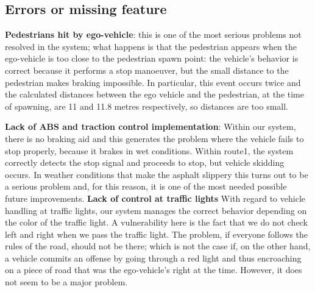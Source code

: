 \documentclass{article}
\begin{document}
\subsection{Errors or missing feature}
\textbf{Pedestrians hit by ego-vehicle}: this is one of the most serious problems not resolved in the system; what 
    happens is that the pedestrian appears when the ego-vehicle is too close to the pedestrian spawn point: the vehicle's behavior 
    is correct because it performs a stop manoeuver, but the small distance to the pedestrian makes braking impossible. 
    In particular, this event occurs twice and the calculated distances between the ego vehicle and the pedestrian, at the time of spawning, 
    are 11 and 11.8 metres respectively, so distances are too small.

\textbf{Lack of ABS and traction control implementation}\label{ABS}: Within our system, there is no braking aid and this generates the 
problem where the vehicle fails to stop properly, because it brakes in wet conditions. 
Within route1, the system correctly detects the stop signal and proceeds to stop, but vehicle skidding occurs.
In weather conditions that make the asphalt slippery this turns out to be a serious problem and, for this reason, it is one 
of the most needed possible future improvements.
\textbf{Lack of control at traffic lights}
With regard to vehicle handling at traffic lights, our system manages the correct behavior depending on the color of the 
traffic light. A vulnerability here is the fact that we do not check left and right when we pass the traffic light. The problem, 
if everyone follows the rules of the road, should not be there; which is not the case if, on the other hand, a vehicle commits 
an offense by going through a red light and thus encroaching on a piece of road that was the ego-vehicle's right at the time.
However, it does not seem to be a major problem.
\end{document}
